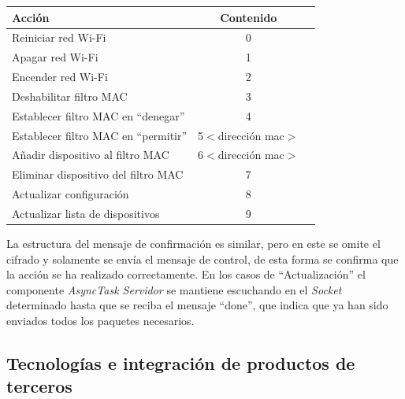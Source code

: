 \documentclass[12pt]{article}
\begin{document}
            \begin{tabular}{|l|c|c|}
                \hline
                \textbf{Acción}                                     &   \textbf{Contenido}      \\         
                \hline
                Reiniciar red Wi-Fi                                 &   0                       \\
                Apagar red Wi-Fi                                    &   1                       \\
                Encender red Wi-Fi                                  &   2                       \\
                Deshabilitar filtro MAC                             &   3                       \\
                Establecer filtro MAC en ``denegar''                &   4                       \\
                Establecer filtro MAC en ``permitir''               &   5$<$dirección mac$>$    \\
                Añadir dispositivo al filtro MAC                    &   6$<$dirección mac$>$    \\
                Eliminar dispositivo del filtro MAC                 &   7                       \\
                Actualizar configuración                            &   8                       \\
                Actualizar lista de dispositivos                    &   9                       \\
                \hline
            \end{tabular}

            La estructura del mensaje de confirmación es similar, pero en este se omite el cifrado y solamente se envía el mensaje de control, de esta forma se confirma que la acción se ha realizado correctamente. En los casos de ``Actualización'' el componente \textit{AsyncTask Servidor} se mantiene escuchando en el \textit{Socket} determinado hasta que se reciba el mensaje ``done'', que indica que ya han sido enviados todos los paquetes necesarios.

    \subsection{Tecnologías e integración de productos de terceros}
\end{document}
